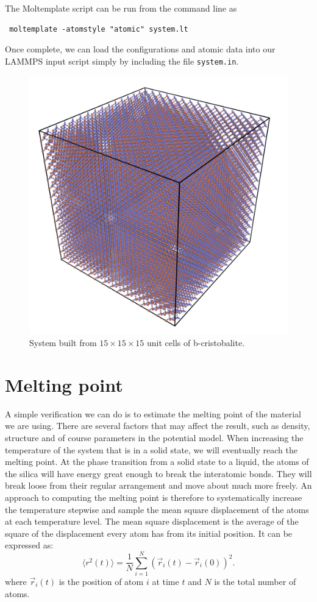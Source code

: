 \documentclass[twoside,english]{uiofysmaster}
\newcommand\lr[1]{\left(#1\right)}
\begin{document}
The Moltemplate script can be run from the command line as
 \begin{lstlisting}
 moltemplate -atomstyle "atomic" system.lt
 \end{lstlisting}
Once complete, we can load the configurations and atomic data into our LAMMPS input script simply by including the file \texttt{system.in}.



\begin{figure}[H]
	\centering
	\includegraphics[width=0.7\linewidth]{figures/CreatingSystem/hugeCube}
	\caption{System built from $15\times15\times15$ unit cells of b-cristobalite.}
	\label{fig:hugeCube}
\end{figure}


\section{Melting point}\label{sec:meltingPoint}
A simple verification we can do is to estimate the melting point of the material we are using. 
There are several factors that may affect the result, such as density, structure and of course parameters in the potential model. 
When increasing the temperature of the system that is in a solid state, we will eventually reach the melting point.
At the phase transition from a solid state to a liquid, the atoms of the silica will have energy great enough to break the interatomic bonds. 
They will break loose from their regular arrangement and move about much more freely. 
An approach to computing the melting point is therefore to systematically increase the temperature stepwise and sample the mean square displacement of the atoms at each temperature level.  
The mean square displacement is the average of the square of the displacement every atom has from its initial position. It can be expressed as:
\begin{equation}
\langle r^2(t)\rangle = \frac{1}{N}\sum_{i=1}^{N}\lr{\vec{r}_i(t)-\vec{r}_i(0)}^2. \label{eq: diffusion constant}
\end{equation}
where $\vec{r}_i(t)$ is the position of atom $i$ at time $t$ and $N$ is the total number of atoms. 
\end{document}
